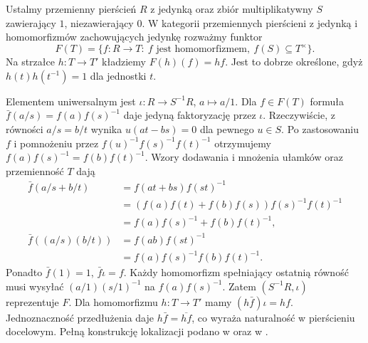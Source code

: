 \begin{przyklad}\label{cat:ex:localization-rep}
Ustalmy przemienny pierścień $R$ z jedynką oraz zbiór multiplikatywny $S$ zawierający $1$, niezawierający $0$. W kategorii przemiennych pierścieni z jedynką i homomorfizmów zachowujących jedynkę rozważmy funktor
\[
F(T)=\{f:R\to T:\ f\text{ jest homomorfizmem},\
 f(S)\subseteq T^\times\}.
\]
Na strzałce $h:T\to T'$ kładziemy $F(h)(f)=hf$. Jest to dobrze określone, gdyż $h(t)h(t^{-1})=1$ dla jednostki $t$.

Elementem uniwersalnym jest $\iota:R\to S^{-1}R$, $a\mapsto a/1$. Dla $f\in F(T)$ formuła
$\bar f(a/s)=f(a)f(s)^{-1}$ daje jedyną faktoryzację przez $\iota$. Rzeczywiście, z równości $a/s=b/t$ wynika $u(at-bs)=0$ dla pewnego $u\in S$. Po zastosowaniu $f$ i pomnożeniu przez $f(u)^{-1}f(s)^{-1}f(t)^{-1}$ otrzymujemy $f(a)f(s)^{-1}=f(b)f(t)^{-1}$. Wzory dodawania i mnożenia ułamków oraz przemienność $T$ dają
\[
\begin{aligned}
\bar f(a/s+b/t)
&=f(at+bs)f(st)^{-1}\\
&=(f(a)f(t)+f(b)f(s))f(s)^{-1}f(t)^{-1}\\
&=f(a)f(s)^{-1}+f(b)f(t)^{-1},\\
\bar f((a/s)(b/t))
&=f(ab)f(st)^{-1}\\
&=f(a)f(s)^{-1}f(b)f(t)^{-1}.
\end{aligned}
\]
Ponadto $\bar f(1)=1$, $\bar f\iota=f$. Każdy homomorfizm spełniający ostatnią równość musi wysyłać $(a/1)(s/1)^{-1}$ na $f(a)f(s)^{-1}$. Zatem $(S^{-1}R,\iota)$ reprezentuje $F$. Dla homomorfizmu $h:T\to T'$ mamy $(h\bar f)\iota=hf$. Jednoznaczność przedłużenia daje $h\bar f=\overline{hf}$, co wyraża naturalność w pierścieniu docelowym. Pełną konstrukcję lokalizacji podano w  oraz w .
\end{przyklad}

